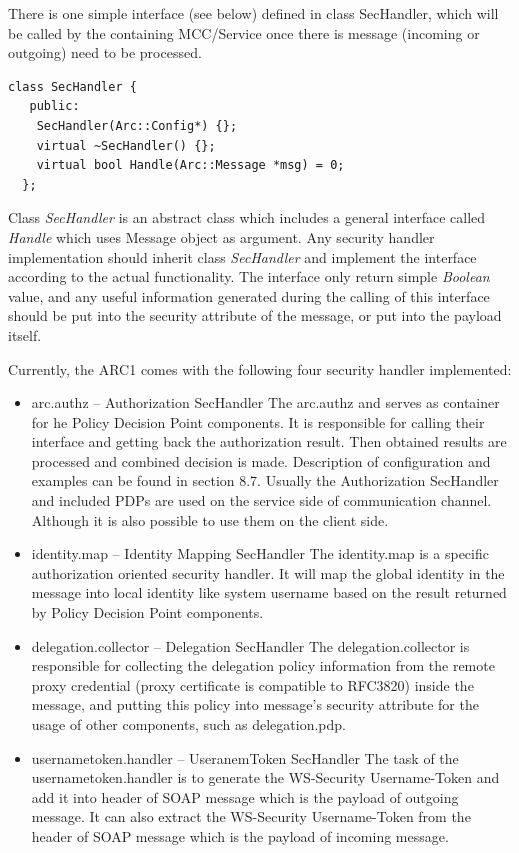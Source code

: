 \documentclass{article}                            %
\begin{document}
There is one simple interface (see below) defined in class SecHandler, which will be called by the containing MCC/Service once there is message (incoming or outgoing) need to be processed.

\begin{verbatim}
class SecHandler {
   public:
    SecHandler(Arc::Config*) {};
    virtual ~SecHandler() {};
    virtual bool Handle(Arc::Message *msg) = 0;
  };
\end{verbatim}

Class \textit{SecHandler} is an abstract class which includes a general interface called \textit{Handle} which uses Message object as argument. Any security handler implementation should inherit class \textit{SecHandler} and implement the interface according to the actual functionality. The interface only return simple \textit{Boolean} value, and any useful information generated during the calling of this interface should be put into the security attribute of the message, or put into the payload itself. 

Currently, the ARC1 comes with the following four security handler implemented:

\begin{itemize}
    \item arc.authz – Authorization SecHandler
The arc.authz and serves as container for he Policy Decision Point components. It is responsible for calling their interface and getting back the authorization result. Then obtained results are processed and   combined decision is made. Description of configuration and examples can be found in section 8.7. Usually the Authorization SecHandler and included PDPs are used on the service side of communication channel. Although it is also possible to use them on the client side.

    \item identity.map – Identity Mapping SecHandler
The identity.map is a specific authorization oriented security handler. It will map the global identity in the message into local identity like system username based on the result returned by Policy Decision Point components.

    \item delegation.collector – Delegation SecHandler
The delegation.collector is responsible for collecting the delegation policy information from the remote proxy credential (proxy certificate is compatible to RFC3820) inside the message, and putting this policy into message’s security attribute for the usage of other components, such as  delegation.pdp.

    \item usernametoken.handler – UseranemToken SecHandler
The task of the  usernametoken.handler is to generate the WS-Security Username-Token and add it into header of SOAP message which is the payload of outgoing message. It can also extract the WS-Security Username-Token from the header of SOAP message which is the payload of incoming message.

\end{itemize}
\end{document}
